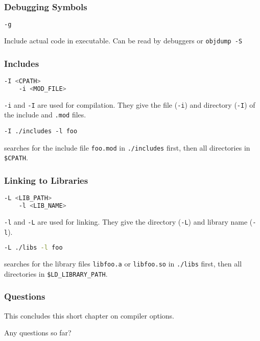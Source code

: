 \begin{frame}[fragile]
    \frametitle{Debugging Symbols}
    \begin{lstlisting}[language=bash]
    -g
    \end{lstlisting}
    Include actual code in executable. Can be read by debuggers or \texttt{objdump -S}
\end{frame}
\begin{frame}[fragile]
    \frametitle{Includes}
    \begin{lstlisting}[language=bash]
    -I <CPATH>
    -i <MOD_FILE>
    \end{lstlisting}
    \texttt{-i} and \texttt{-I} are used for compilation. They give the file (\texttt{-i}) and directory (\texttt{-I}) of the include and \texttt{.mod} files.

    \begin{lstlisting}[numbers=none]
    -I ./includes -l foo
    \end{lstlisting}
    searches for the include file \texttt{foo.mod} in \texttt{./includes} first, then all directories in \texttt{\$CPATH}.
\end{frame}
\begin{frame}[fragile]
    \frametitle{Linking to Libraries}
    \begin{lstlisting}[language=bash]
    -L <LIB_PATH>
    -l <LIB_NAME>
    \end{lstlisting}
    \texttt{-l} and \texttt{-L} are used for linking. They give the directory (\texttt{-L}) and library name (\texttt{-l}). 

    \begin{lstlisting}[language=bash]
    -L ./libs -l foo
    \end{lstlisting}
    searches for the library files \texttt{libfoo.a} or \texttt{libfoo.so} in \texttt{./libs} first, then all directories in \texttt{\$LD\_LIBRARY\_PATH}.
\end{frame}

\begin{frame}
    \frametitle{Questions}
    This concludes this short chapter on compiler options.

    Any questions so far?
\end{frame}
